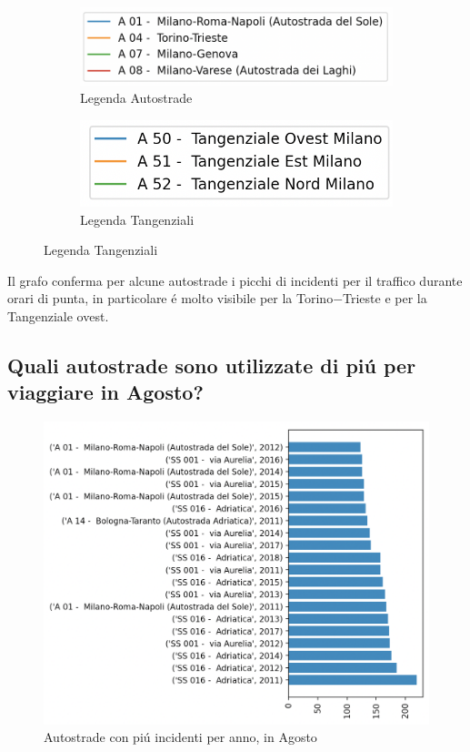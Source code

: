 \documentclass[a4paper]{report}
\begin{document}
\begin{figure}[!ht]
    \begin{subfigure}{\textwidth}
        \centering
    \includegraphics[width=0.6\linewidth]{../src/incidenti/incidenti_aci/autostrade/legenda_autostrade.png}
    \caption{Legenda Autostrade}
    \label{fig:legenda_autostrade}
    \end{subfigure}%
    \begin{subfigure}{\textwidth}
        \centering
    \includegraphics[width=0.5\linewidth]{../src/incidenti/incidenti_aci/autostrade/legenda_tangenziali.png}
    \caption{Legenda Tangenziali}
    \label{fig:legenda_tangenziali}
    \end{subfigure}
\end{figure}

Il grafo conferma per alcune autostrade i picchi di incidenti per il traffico durante orari 
di punta, in particolare \'e molto visibile per la Torino$-$Trieste e per la Tangenziale ovest.


\newpage
\subsection{Quali autostrade sono utilizzate di pi\'u per viaggiare in Agosto?}

\begin{figure}[!ht]
    \includegraphics[width=\linewidth]{../src/incidenti/incidenti_aci/agosto/autostrade_anno_agosto.png}
    \caption{Autostrade con pi\'u incidenti per anno, in Agosto}
    \label{fig:autostrade_anno_agosto}
\end{figure}
\end{document}
